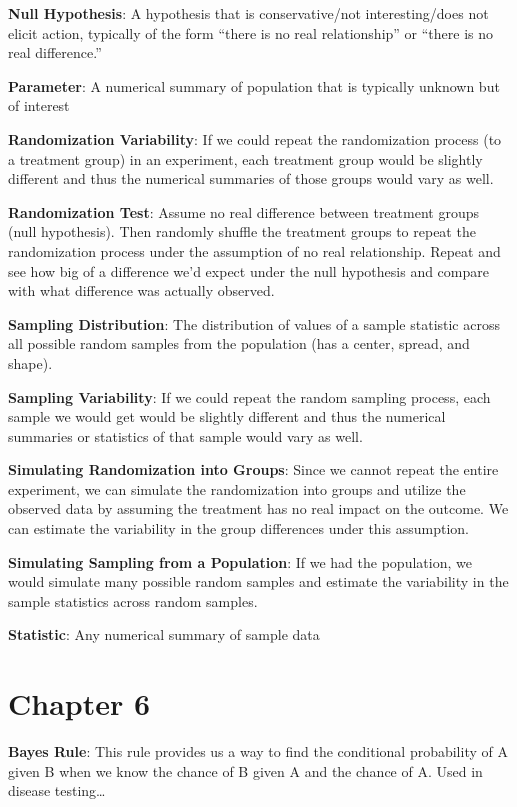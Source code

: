 \documentclass[
]{book}
\begin{document}
\textbf{Null Hypothesis}: A hypothesis that is conservative/not interesting/does not elicit action, typically of the form ``there is no real relationship'' or ``there is no real difference.''

\textbf{Parameter}: A numerical summary of population that is typically unknown but of interest

\textbf{Randomization Variability}: If we could repeat the randomization process (to a treatment group) in an experiment, each treatment group would be slightly different and thus the numerical summaries of those groups would vary as well.

\textbf{Randomization Test}: Assume no real difference between treatment groups (null hypothesis). Then randomly shuffle the treatment groups to repeat the randomization process under the assumption of no real relationship. Repeat and see how big of a difference we'd expect under the null hypothesis and compare with what difference was actually observed.

\textbf{Sampling Distribution}: The distribution of values of a sample statistic across all possible random samples from the population (has a center, spread, and shape).

\textbf{Sampling Variability}: If we could repeat the random sampling process, each sample we would get would be slightly different and thus the numerical summaries or statistics of that sample would vary as well.

\textbf{Simulating Randomization into Groups}: Since we cannot repeat the entire experiment, we can simulate the randomization into groups and utilize the observed data by assuming the treatment has no real impact on the outcome. We can estimate the variability in the group differences under this assumption.

\textbf{Simulating Sampling from a Population}: If we had the population, we would simulate many possible random samples and estimate the variability in the sample statistics across random samples.

\textbf{Statistic}: Any numerical summary of sample data

\hypertarget{chapter-6}{%
\section{Chapter 6}\label{chapter-6}}

\textbf{Bayes Rule}: This rule provides us a way to find the conditional probability of A given B when we know the chance of B given A and the chance of A. Used in disease testing\ldots{}
\end{document}
